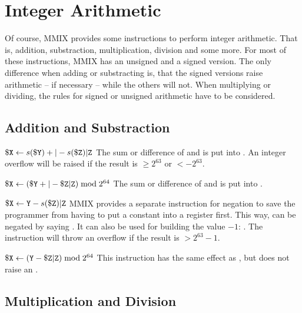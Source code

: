 \section{Integer Arithmetic}

Of course, MMIX provides some instructions to perform integer arithmetic. That is, addition, substraction, multiplication, division and some more. For most of these instructions, MMIX has an unsigned and a signed version. The only difference when adding or substracting is, that the signed versions raise arithmetic  -- if necessary -- while the others will not. When multiplying or dividing, the rules for signed or unsigned arithmetic have to be considered.

\subsection{Addition and Substraction}

\instrtbl
	{}
	{${\tt \$X} \leftarrow s({\tt \$Y}) +|- s({\tt \$Z}){\tt|Z}$}
\noindent The sum or difference of  and  is put into . An integer overflow  will be raised if the result is $\ge 2^{63}$ or $< -2^{63}$. \citep[pg. 6]{mmix-doc}

\instrtbl
	{}
	{${\tt \$X} \leftarrow ({\tt \$Y} +|- {\tt \$Z}{\tt|Z}) \bmod 2^{64}$}
\noindent The sum or difference of  and  is put into . \citep[pg. 6]{mmix-doc}

\instrtbl
	{}
	{${\tt \$X} \leftarrow {\tt Y} - s({\tt \$Z}){\tt|Z}$}
\noindent MMIX provides a separate instruction for negation to save the programmer from having to put a constant into a register first. This way, \eg {} can be negated by saying . It can also be used for building the value $-1$: . The instruction will throw an overflow  if the result is $> 2^{63}-1$. \citep[pg. 6]{mmix-doc}

\instrtbl
	{}
	{${\tt \$X} \leftarrow ({\tt Y} - {\tt \$Z}{\tt|Z}) \bmod 2^{64}$}
\noindent This instruction has the same effect as , but does not raise an . \citep[pg. 6]{mmix-doc}

\subsection{Multiplication and Division}

